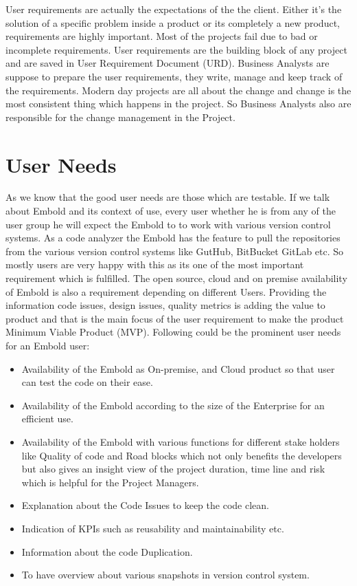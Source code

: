 User requirements are actually the expectations of the the client. Either it's the solution of a specific problem inside a product or its completely a new product, requirements are highly important. Most of the projects fail due to bad or incomplete requirements. User requirements are the building block of any project and are saved in User Requirement Document (URD). Business Analysts are suppose to prepare the user requirements, they write, manage and keep track of the requirements. Modern day projects are all about the change and change is the most consistent thing which happens in the project. So Business Analysts also are responsible for the change management in the Project.
\section{User Needs}
As we know that the good user needs are those which are testable. If we talk about Embold and its context of use, every user whether he is from any of the user group he will expect the Embold to to work with various version control systems. As a code analyzer the Embold has the feature to pull the repositories from the various version control systems like GutHub, BitBucket GitLab etc. So mostly users are very happy with this as its one of the most important requirement which is fulfilled. The open source, cloud and on premise availability of Embold is also a requirement depending on different Users. Providing the information code  issues, design issues, quality metrics is adding the value to product and that is the main focus of the user requirement to make the product Minimum Viable Product (MVP). Following could be the prominent user needs for an Embold user:
\begin{itemize}
\item Availability of the Embold as On-premise, and Cloud product so that user can test the code on their ease.
\item Availability of the Embold according to the size of the Enterprise for an efficient use.
\item Availability of the Embold with various functions for different stake holders like Quality of code and Road blocks  which not only benefits the developers but also gives an insight view of the project duration, time line and risk which is helpful for the Project Managers. 
\item Explanation about the Code Issues to keep the code clean.
\item Indication of KPIs such as reusability and maintainability etc. 
\item Information about the code Duplication. 
\item To have overview about various snapshots in version control system. 
\end{itemize}
